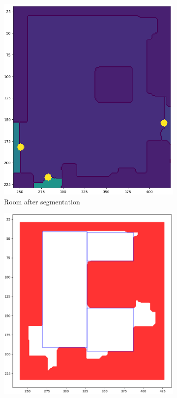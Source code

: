 \begin{figure}[h]
    \captionsetup[subfigure]{justification=centering}
    \centering
    \begin{subfigure}{.235\textwidth}
      \centering
      \includegraphics[width=\textwidth]{figures/50_implementation/ryu_room2_clean.png}
      \caption{Room after segmentation}
    \end{subfigure}%
    \begin{subfigure}{.25\textwidth}
      \centering
      \includegraphics[width=\textwidth]{figures/50_implementation/ryu_room2_rectangles.png}

\end{subfigure}
\end{figure}
